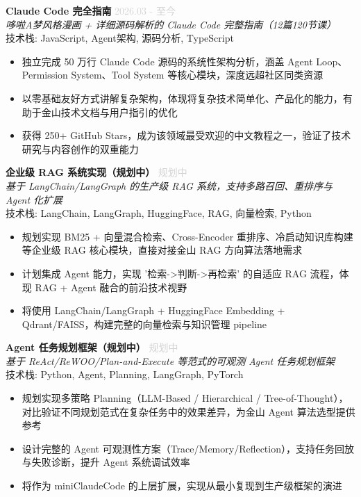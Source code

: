 \documentclass[11pt,a4paper]{article}
\begin{document}
\noindent\textbf{Claude Code 完全指南} \hfill \textcolor{lightgray}{2026.03 - 至今}\\
\textit{哆啦A梦风格漫画 + 详细源码解析的 Claude Code 完整指南（12篇120节课）}\\
技术栈: JavaScript, Agent架构, 源码分析, TypeScript
\begin{itemize}

  \item 独立完成 50 万行 Claude Code 源码的系统性架构分析，涵盖 Agent Loop、Permission System、Tool System 等核心模块，深度远超社区同类资源

  \item 以零基础友好方式讲解复杂架构，体现将复杂技术简单化、产品化的能力，有助于金山技术文档与用户指引的优化

  \item 获得 250+ GitHub Stars，成为该领域最受欢迎的中文教程之一，验证了技术研究与内容创作的双重能力

\end{itemize}


\noindent\textbf{企业级 RAG 系统实现（规划中）} \hfill \textcolor{lightgray}{规划中}\\
\textit{基于 LangChain/LangGraph 的生产级 RAG 系统，支持多路召回、重排序与 Agent 化扩展}\\
技术栈: LangChain, LangGraph, HuggingFace, RAG, 向量检索, Python
\begin{itemize}

  \item 规划实现 BM25 + 向量混合检索、Cross-Encoder 重排序、冷启动知识库构建等企业级 RAG 核心模块，直接对接金山 RAG 方向算法落地需求

  \item 计划集成 Agent 能力，实现 '检索->判断->再检索' 的自适应 RAG 流程，体现 RAG + Agent 融合的前沿技术视野

  \item 将使用 LangChain/LangGraph + HuggingFace Embedding + Qdrant/FAISS，构建完整的向量检索与知识管理 pipeline

\end{itemize}


\noindent\textbf{Agent 任务规划框架（规划中）} \hfill \textcolor{lightgray}{规划中}\\
\textit{基于 ReAct/ReWOO/Plan-and-Execute 等范式的可观测 Agent 任务规划框架}\\
技术栈: Python, Agent, Planning, LangGraph, PyTorch
\begin{itemize}

  \item 规划实现多策略 Planning（LLM-Based / Hierarchical / Tree-of-Thought），对比验证不同规划范式在复杂任务中的效果差异，为金山 Agent 算法选型提供参考

  \item 设计完整的 Agent 可观测性方案（Trace/Memory/Reflection），支持任务回放与失败诊断，提升 Agent 系统调试效率

  \item 将作为 miniClaudeCode 的上层扩展，实现从最小复现到生产级框架的演进

\end{itemize}
\end{document}
